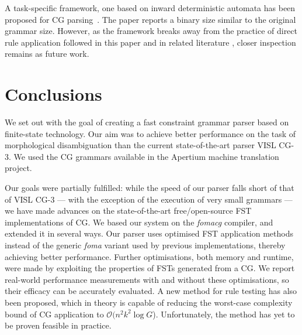\documentclass[11pt]{article}
\begin{document}
A task-specific framework, one based on inward deterministic automata has
been proposed for CG parsing~\cite{Yli-Jyra:2011}. The paper reports a binary
size similar to the original grammar size. However, as the framework breaks away
from the practice of direct rule application followed in this paper and
in related literature \cite{Hulden:2011,Peltonen:2011}, closer inspection remains as future work. 


\section{Conclusions}
\label{sec:conclusion}
We set out with the goal of creating a fast constraint grammar parser based on
finite-state technology. Our aim was to achieve better performance on the task
of morphological disambiguation than the current state-of-the-art parser
VISL CG-3. We used the CG grammars available in the Apertium machine translation
project.

Our goals were partially fulfilled: while the speed of our parser falls short
of that of VISL CG-3 --- with the exception of the execution of very small grammars --- we have made advances on the state-of-the-art
free/open-source FST implementations of CG. We based our system on the
\emph{fomacg} compiler, and extended it in several ways. Our parser  %
uses optimised FST application methods instead of the generic \emph{foma} variant
used by previous implementations, thereby achieving better performance.
Further optimisations, both memory and runtime, were made
by exploiting the properties of FSTs generated from a CG. We report real-world
performance measurements with and without these optimisations, so their efficacy
can be accurately evaluated.
A new method for rule testing has also been proposed, which in theory is capable
of reducing the worst-case complexity bound of CG application to
$\mathcal{O}(n^2k^2\log G$). Unfortunately, the method has yet to be proven feasible in
practice.
\end{document}
